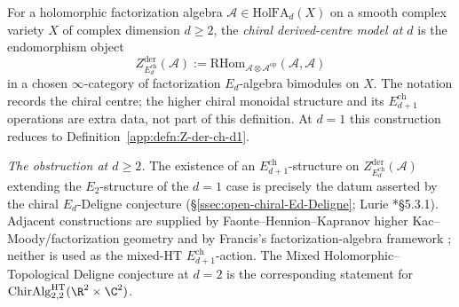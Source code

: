 \begin{defn}\label{app:defn:Z-der-ch-dgeq2}
For a holomorphic factorization algebra
$\mathcal A\in\mathrm{HolFA}_d(X)$ on a smooth complex variety $X$ of
complex dimension \(d\geq2\), the \emph{chiral derived-centre model
at \(d\)} is the endomorphism object
\[
  Z^{\mathrm{der}}_{E_d^{\mathrm{ch}}}(\mathcal A)
   :=
   \mathrm{RHom}_{\mathcal A\otimes\mathcal A^{\mathrm{op}}}(\mathcal A,\mathcal A)
\]
in a chosen \(\infty\)-category of factorization \(E_d\)-algebra
bimodules on \(X\).  The notation records the chiral centre;
the higher chiral monoidal structure and its \(E_{d+1}^{\mathrm{ch}}\)
operations are extra data, not part of this definition.  At \(d=1\)
this construction reduces to Definition~\ref{app:defn:Z-der-ch-d1}.

\emph{The obstruction at $d\geq 2$.}  The existence of an
$E_{d+1}^{\mathrm{ch}}$-structure on
$Z^{\mathrm{der}}_{E_d^{\mathrm{ch}}}(\mathcal A)$ extending the
$E_2$-structure of the $d=1$ case is precisely the datum asserted by
the chiral $E_d$-Deligne conjecture
(\S\ref{ssec:open-chiral-Ed-Deligne}; Lurie
\cite{lurie-ha}*{\S 5.3.1}).  Adjacent constructions are supplied by
Faonte--Hennion--Kapranov higher Kac--Moody/factorization geometry
\cite{faonte-hennion-kapranov-higher-km} and by Francis's
factorization-algebra framework \cite{francis-thesis}; neither is used
as the mixed-HT \(E_{d+1}^{\mathrm{ch}}\)-action.  The Mixed
Holomorphic--Topological Deligne conjecture at $d=2$ is the
corresponding statement for
$\mathrm{ChirAlg}^{\mathrm{HT}}_{2,2}(\R^2\times\C^2)$.
\end{defn}

